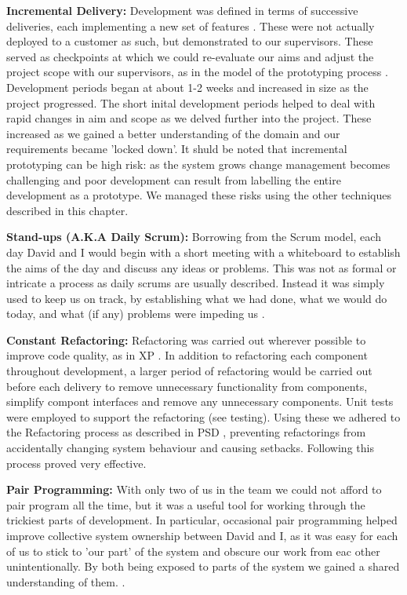 \documentclass[a4paper,11pt]{report}
\begin{document}
\begin{itemize}
\item{\textbf{Incremental Delivery:} Development was defined in terms of successive deliveries, each implementing a new set of features \cite[p.~84]{PSDNotes}. These were not actually deployed to a customer as such, but demonstrated to our supervisors. These served as checkpoints at which we could re-evaluate our aims and adjust the project scope with our supervisors, as in the model of the prototyping process \cite[fig.~16.1]{PSDNotes}. Development periods began at about 1-2 weeks and increased in size as the project progressed. The short inital development periods helped to deal with rapid changes in aim and scope as we delved further into the project. These increased as we gained a better understanding of the domain and our requirements became 'locked down'. It shuld be noted that incremental prototyping can be high risk: as the system grows change management becomes challenging and poor development can result from labelling the entire development as a prototype\cite[sec.~16.4.6]{PSDNotes}. We managed these risks using the other techniques described in this chapter. }
\item{\textbf{Stand-ups (A.K.A Daily Scrum):} Borrowing from the Scrum model, each day David and I would begin with a short meeting with a whiteboard to establish the aims of the day and discuss any ideas or problems. This was not as formal or intricate a process as daily scrums are usually described. Instead it was simply used to keep us on track, by establishing what we had done, what we would do today, and what (if any) problems were impeding us \cite{ScrumStandup}.
\item{\textbf{Constant Refactoring:} Refactoring was carried out wherever possible to improve code quality, as in XP \cite[fig.~3.4]{Sommerville}. In addition to refactoring each component throughout development, a larger period of refactoring would be carried out before each delivery to remove unnecessary functionality from components, simplify compont interfaces and remove any unnecessary components. Unit tests were employed to support the refactoring (see testing). Using these we adhered to the Refactoring process as described in PSD \cite[fig.~28.1]{PSDNotes}, preventing refactorings from accidentally changing system behaviour and causing setbacks. Following this process proved very effective.}
\item{\textbf{Pair Programming:} With only two of us in the team we could not afford to pair program all the time, but it was a useful tool for working through the trickiest parts of development. In particular, occasional pair programming helped improve collective system ownership between David and I, as it was easy for each of us to stick to 'our part' of the system and obscure our work from eac other unintentionally. By both being exposed to parts of the system we gained a shared understanding of them. \cite[sec.~3.3.1,pt 1.]{Sommerville}.} 
}
\end{itemize}
\end{document}
